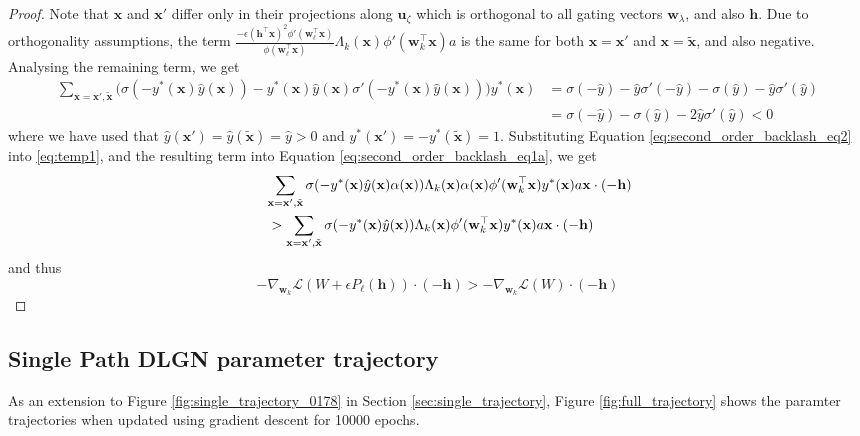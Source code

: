 \documentclass{article}
\theoremstyle{plain}
\theoremstyle{definition}
\theoremstyle{remark}
\newcommand{\1}{{\mathbf 1}}
\newcommand{\0}{{\mathbf 0}}
\newcommand{\h}{{\mathbf h}}
\newcommand{\w}{{\mathbf w}}
\newcommand{\x}{{\mathbf x}}
\newcommand{\bu}{{\mathbf u}}
\renewcommand{\>}{{\rightarrow}}
\begin{document}
\begin{proof}
Note that $\x$ and $\x'$ differ only in their projections along $\bu_\zeta$ which is orthogonal to all gating vectors $\w_\lambda$, and also $\h$. Due to orthogonality assumptions, the term $\frac{ -\epsilon(\h^\top\x)^2 \phi'(\w_\ell^\top \x)}{\phi(\w_\ell^\top \x)}\Lambda_k(\x) \phi'(\w_k^\top \x) a$ is the same for both $\x=\x'$ and $\x=\tilde \x$, and also negative. Analysing the remaining term, we get
\begin{align}
\sum_{\x=\x',\tilde\x}  \Big( \sigma(-y^*(\x) \hat y(\x))-y^*(\x)\hat y(\x) \sigma'(-y^*(\x) \hat y(\x)) \Big) y^*(\x)
&=
\sigma(-\hat y) - \hat y \sigma'(-\hat y) - \sigma(\hat y) - \hat y \sigma'(\hat y) \nonumber \\
&=  \sigma(-\hat y) - \sigma(\hat y) - 2 \hat y \sigma'(\hat y) < 0\label{eq:second_order_backlash_eq2}  
\end{align}
where we have used that $\hat y(\x') = \hat y (\tilde \x) = \hat y > 0$ and $y^*(\x') = - y^*(\tilde \x) = 1$.
Substituting Equation \ref{eq:second_order_backlash_eq2} into \ref{eq:temp1}, and the resulting term into Equation \ref{eq:second_order_backlash_eq1a}, we get
\begin{align}
\lefteqn{\sum_{\x=\x',\tilde\x} \sigma (-y^*(\x) \hat y(\x)\alpha(\x)) \Lambda_k(\x) \alpha(\x) \phi'(\w_k^\top \x) y^*(\x) a \x \cdot (-\h)} \nonumber \\ 
&>
\sum_{\x=\x',\tilde\x} \sigma (-y^*(\x) \hat y(\x)) \Lambda_k(\x) \phi'(\w_k^\top \x) y^*(\x)a \x \cdot (-\h)  \nonumber
\end{align}
and thus
\[
-\nabla_{\w_k} \mathcal{L}(W + \epsilon P_\ell(\h)) \cdot (-\h) 
>
-\nabla_{\w_k} \mathcal{L}(W) \cdot (-\h) 
\]
\end{proof}



\subsection{Single Path DLGN parameter trajectory}
As an extension to Figure \ref{fig:single_trajectory_0178} in Section \ref{sec:single_trajectory}, Figure \ref{fig:full_trajectory} shows the paramter trajectories when updated using gradient descent for 10000 epochs.

\end{document}
